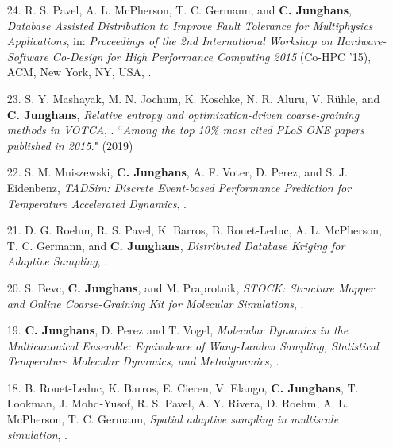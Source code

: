 \documentclass{article}
\begin{document}
\begin{enumerate}
\item[24.] R. S. Pavel, A. L. McPherson, T. C. Germann, and \textbf{C. Junghans},
  \textit{Database Assisted Distribution to Improve Fault Tolerance for Multiphysics Applications},
  in: \textit{Proceedings of the 2nd International Workshop on Hardware-Software Co-Design for High Performance Computing 2015} (Co-HPC '15),
  ACM, New York, NY, USA, .

\item[23.] S. Y. Mashayak, M. N. Jochum, K. Koschke, N. R. Aluru, V. R{\"u}hle, and \textbf{C. Junghans},
  \textit{Relative entropy and optimization-driven coarse-graining methods in VOTCA},
  .
   ``\emph{Among the top 10\% most cited PLoS ONE papers published in 2015.}" (2019)

\item[22.] S. M. Mniszewski, \textbf{C. Junghans}, A. F. Voter, D. Perez, and S. J. Eidenbenz,
  \textit{TADSim: Discrete Event-based Performance Prediction for Temperature Accelerated Dynamics},
  .

\item[21.] D. G. Roehm, R. S. Pavel, K. Barros, B. Rouet-Leduc, A. L. McPherson, T. C. Germann, and \textbf{C. Junghans},
  \textit{Distributed Database Kriging for Adaptive Sampling},
  .

\item[20.] S. Bevc, \textbf{C. Junghans}, and M. Praprotnik,
  \textit{STOCK: Structure Mapper and Online Coarse-Graining Kit for Molecular Simulations},
  .

\item[19.] \textbf{C. Junghans}, D. Perez and T. Vogel,
  \textit{Molecular Dynamics in the Multicanonical Ensemble: Equivalence of Wang-Landau Sampling, Statistical Temperature Molecular Dynamics, and Metadynamics},
  .

\item[18.] B. Rouet-Leduc, K. Barros, E. Cieren, V. Elango, \textbf{C. Junghans}, T. Lookman, J. Mohd-Yusof, R. S. Pavel, A. Y. Rivera, D. Roehm, A. L. McPherson, T. C. Germann,
  \textit{Spatial adaptive sampling in multiscale simulation},
  .


\end{enumerate}
\end{document}
